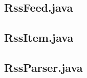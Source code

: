 \documentclass[titlepage, twoside, a4paper, 12pt]{article}
\begin{document}
\newpage
\subsection{RssFeed.java}\label{RssFeed.java}
\begin{footnotesize}
  
\end{footnotesize}

\newpage
\subsection{RssItem.java}\label{RssItem.java}
\begin{footnotesize}
  
\end{footnotesize}

\newpage
\subsection{RssParser.java}\label{RssParser.java}
\begin{footnotesize}
  
\end{footnotesize}
  
\end{document}
